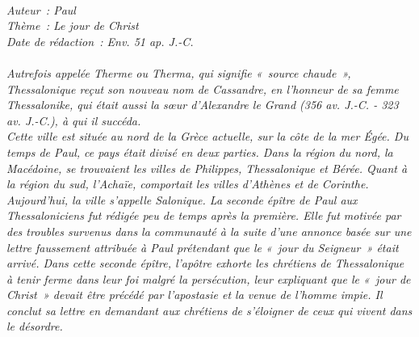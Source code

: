 \BFont
\noindent\hrulefill
{\footnotesize
\textit{
\bigskip
{\centering{}
\\Auteur~: Paul
\\Thème~: Le jour de Christ
\\Date de rédaction~: Env. 51 ap. J.-C.\\}
}
\textit{
\\Autrefois appelée Therme ou Therma, qui signifie «~source chaude~», Thessalonique reçut son nouveau nom de Cassandre, en l'honneur de sa femme Thessalonike, qui était aussi la sœur d'Alexandre le Grand (356 av. J.-C. - 323 av. J.-C.), à qui il succéda.
\\Cette ville est située au nord de la Grèce actuelle, sur la côte de la mer Égée. Du temps de Paul, ce pays était divisé en deux parties. Dans la région du nord, la Macédoine, se trouvaient les villes de Philippes, Thessalonique et Bérée. Quant à la région du sud, l'Achaïe, comportait les villes d'Athènes et de Corinthe. Aujourd'hui, la ville s'appelle Salonique. La seconde épître de Paul aux Thessaloniciens fut rédigée peu de temps après la première. Elle fut motivée par des troubles survenus dans la communauté à la suite d'une annonce basée sur une lettre faussement attribuée à Paul prétendant que le «~jour du Seigneur~» était arrivé. Dans cette seconde épître, l'apôtre exhorte les chrétiens de Thessalonique à tenir ferme dans leur foi malgré la persécution, leur expliquant que le «~jour de Christ~» devait être précédé par l'apostasie et la venue de l'homme impie. Il conclut sa lettre en demandant aux chrétiens de s'éloigner de ceux qui vivent dans le désordre.\bigskip
}
}
\par\nobreak\noindent\hrulefill
